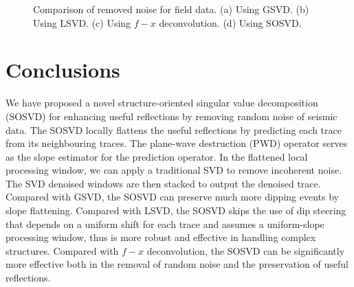 {\begin{figure}[htb!]
\centering
{}
\caption{Comparison of removed noise for field data. (a) Using GSVD. (b) Using LSVD. (c) Using $f-x$ deconvolution. (d) Using SOSVD.}
\label{fig:field-n-gsvd,field-n-lsvd,field-n-fx,field-n-svd}
\end{figure}
}


\section{Conclusions}
We have proposed a novel structure-oriented singular value decomposition (SOSVD) for enhancing useful reflections by removing random noise of seismic data. The SOSVD locally flattens the useful reflections by predicting each trace from its neighbouring traces. The plane-wave destruction (PWD) operator serves as the slope estimator for the prediction operator. In the flattened local processing window, we can apply a traditional SVD to remove incoherent noise. The SVD denoised windows are then stacked to output the denoised trace. Compared with GSVD, the SOSVD can preserve much more dipping events by slope flattening. Compared with LSVD, the SOSVD skips the use of dip steering that depends on a uniform shift for each trace and assumes a uniform-slope processing window, thus is more robust and effective in handling complex structures. Compared with $f-x$ deconvolution, the SOSVD can be significantly more effective both in the removal of random noise and the preservation of useful reflections. 


